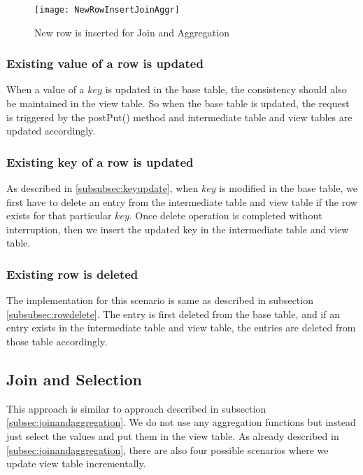 \documentclass[11pt,a4paper,bibtotoc,idxtotoc,headsepline,footsepline,footexclude,BCOR12mm,DIV13]{scrbook}
\begin{document}
\begin{figure}
    \centering
    \texttt{[image: NewRowInsertJoinAggr]}
    \caption{New row is inserted for Join and Aggregation}
    \label{sec:insertnewrowjoinandaggr}
    
\end{figure}

\newpage

\subsubsection{Existing value of a row is updated}
When a value of a $key$ is updated in the base table, the consistency should also be maintained in the view table. So when the base table is updated, the request is triggered by the postPut() method and intermediate table and view tables are updated accordingly.

\subsubsection{Existing key of a row is updated}
As described in \ref{subsubsec:keyupdate}, when $key$ is modified in the base table, we first have to delete an entry from the intermediate table and view table if the row exists for that particular $key$. Once delete operation is completed without interruption, then we insert the updated key in the intermediate table and view table.

\subsubsection{Existing row is deleted}
The implementation for this scenario is same as described in subsection \ref{subsubsec:rowdelete}. The entry is first deleted from the base table, and if an entry exists in the intermediate table and view table, the entries are deleted from those table accordingly.

\subsection{Join and Selection}
This approach is similar to approach described in subsection \ref{subsec:joinandaggregation}. We do not use any aggregation functions but instead just select the values and put them in the view table. As already described in \ref{subsec:joinandaggregation}, there are also four possible scenarios where we update view table incrementally.

\newpage
\end{document}
